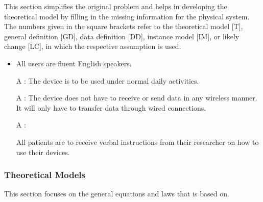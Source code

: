 \documentclass[12pt]{article}
\newcounter{assumpnum} %
\begin{document}
This section simplifies the original problem and helps in developing the
theoretical model by filling in the missing information for the physical
system. The numbers given in the square brackets refer to the theoretical model
  [T], general definition [GD], data definition [DD], instance model [IM], or
likely change [LC], in which the respective assumption is used.

\begin{itemize}

\item[A\refstepcounter{assumpnum}\theassumpnum

\label{A_meaningfulLabel}:]
{All users are fluent English speakers.}

\item[A\refstepcounter{assumpnum}\theassumpnum
\label{A_meaningfulLabel}:]
{The device is to be used under normal daily activities.}

\item[A\refstepcounter{assumpnum}\theassumpnum
\label{A_meaningfulLabel}:]
{The device does not have to receive or send data in any wireless manner. It will only have to transfer data through wired connections.}

\item[A\refstepcounter{assumpnum}\theassumpnum
\label{A_meaningfulLabel}:]

{All patients are to receive verbal instructions from their researcher on how to use their devices.}

\end{itemize}

\subsubsection{Theoretical Models}\label{sec_theoretical}


This section focuses on the general equations and laws that \progname{} is based
on.  

~\newline
\end{document}
